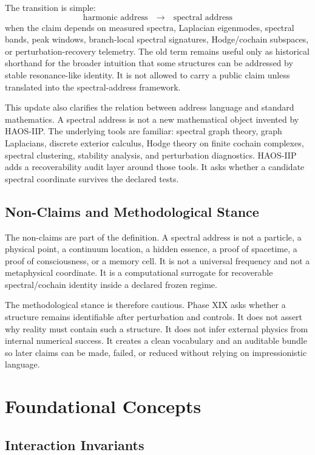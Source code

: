 \documentclass[11pt]{article}
\begin{document}
The transition is simple:
\[
\text{harmonic address}
\quad \longrightarrow \quad
\text{spectral address}
\]
when the claim depends on measured spectra, Laplacian eigenmodes, spectral bands, peak windows, branch-local spectral signatures, Hodge/cochain subspaces, or perturbation-recovery telemetry. The old term remains useful only as historical shorthand for the broader intuition that some structures can be addressed by stable resonance-like identity. It is not allowed to carry a public claim unless translated into the spectral-address framework.

This update also clarifies the relation between address language and standard mathematics. A spectral address is not a new mathematical object invented by HAOS-IIP. The underlying tools are familiar: spectral graph theory, graph Laplacians, discrete exterior calculus, Hodge theory on finite cochain complexes, spectral clustering, stability analysis, and perturbation diagnostics. HAOS-IIP adds a recoverability audit layer around those tools. It asks whether a candidate spectral coordinate survives the declared tests.

\subsection{Non-Claims and Methodological Stance}

The non-claims are part of the definition. A spectral address is not a particle, a physical point, a continuum location, a hidden essence, a proof of spacetime, a proof of consciousness, or a memory cell. It is not a universal frequency and not a metaphysical coordinate. It is a computational surrogate for recoverable spectral/cochain identity inside a declared frozen regime.

The methodological stance is therefore cautious. Phase XIX asks whether a structure remains identifiable after perturbation and controls. It does not assert why reality must contain such a structure. It does not infer external physics from internal numerical success. It creates a clean vocabulary and an auditable bundle so later claims can be made, failed, or reduced without relying on impressionistic language.

\section{Foundational Concepts}

\subsection{Interaction Invariants}
\end{document}
